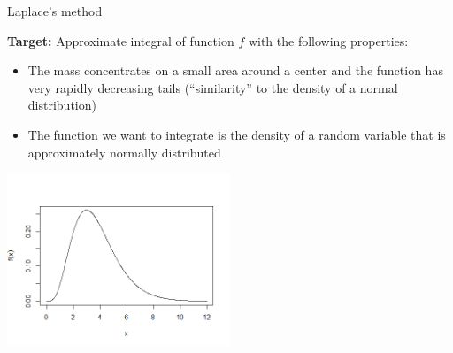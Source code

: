 










\begin{vbframe}{Laplace's method}


\textbf{Target:} Approximate integral of function $f$ with the following properties:

\begin{itemize}
\item The mass concentrates on a small area around a center and the function has very rapidly decreasing tails
(\enquote{similarity} to the density of a normal distribution)
\item The function we want to integrate is the density of a random variable that is approximately normally distributed
\end{itemize}

%
%


\begin{center}
\includegraphics[width =0.5\textwidth]{figure_man/normaldist.png}
\end{center}


\end{vbframe}

